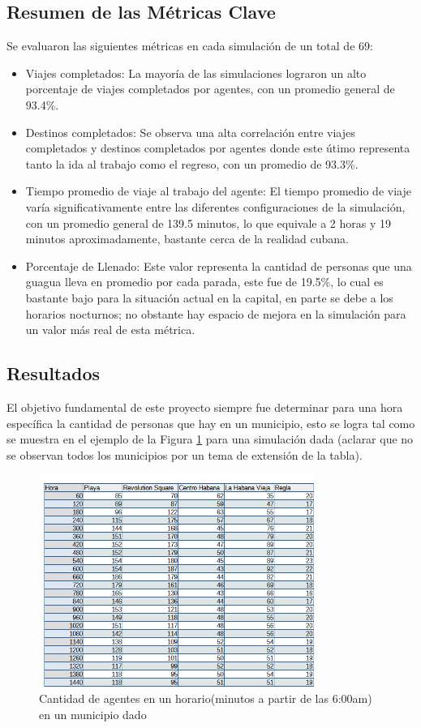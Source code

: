 \documentclass[a4paper,12pt]{article}
\begin{document}
\subsection{Resumen de las Métricas Clave}

Se evaluaron las siguientes métricas en cada simulación de un total de 69:

\begin{itemize}
\item Viajes completados: La mayoría de las simulaciones lograron un alto porcentaje de viajes completados por agentes, con un promedio general de 93.4\%.
\item Destinos completados: Se observa una alta correlación entre viajes completados y destinos completados por agentes donde este \'utimo representa tanto la ida al trabajo como el regreso, con un promedio de 93.3\%.
\item Tiempo promedio de viaje al trabajo del agente: El tiempo promedio de viaje varía significativamente entre las diferentes configuraciones de la simulación, con un promedio general de 139.5 minutos, lo que equivale a 2 horas y 19 minutos aproximadamente, bastante cerca de la realidad cubana.
\item Porcentaje de Llenado: Este valor representa la cantidad de personas que una guagua lleva en promedio por cada parada, este fue de 19.5\%, lo cual es bastante bajo para la situaci\'on actual en la capital, en parte se debe a los horarios  nocturnos; no obstante hay espacio de mejora en la simulaci\'on para un valor m\'as real de esta m\'etrica.
\end{itemize}

\subsection{Resultados}
El objetivo fundamental de este proyecto siempre fue determinar para una hora espec\'ifica la cantidad de personas que hay en un municipio, esto se logra tal como se muestra en el ejemplo de la Figura \ref{fig:1} para una simulaci\'on dada (aclarar que no se observan todos los municipios por un tema de extensi\'on de la tabla).

\begin{figure}[H]
    \centering
    \includegraphics[width=0.8\textwidth]{imgs/s1000.png}
    \caption{Cantidad de agentes en un horario(minutos a partir de las 6:00am) en un municipio dado}
    \label{fig:1}
\end{figure}
\end{document}
